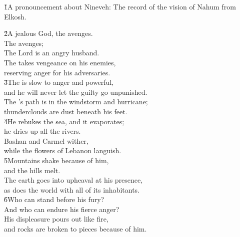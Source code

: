 


\v{1}A pronouncement about Nineveh: The record of the vision of Nahum from Elkosh.

\begin{poetry}
\poeml \v{2}A jealous God, the  avenges. \\
\poemll    The  avenges; \\
\poeml The Lord is an angry husband. \\
\poeml The  takes vengeance on his enemies, \\
\poemll    reserving anger for his adversaries. \\
\poeml \v{3}The  is slow to anger and powerful, \\
\poemll    and he will never let the guilty go unpunished. \\
\poeml The 's path is in the windstorm and hurricane; \\
\poemll    thunderclouds are dust beneath his feet. \\
\poeml \v{4}He rebukes the sea, and it evaporates; \\
\poemll    he dries up all the rivers. \\
\poeml Bashan and Carmel wither, \\
\poemll    while the flowers of Lebanon languish. \\
\poeml \v{5}Mountains shake because of him, \\
\poemll    and the hills melt. \\
\poeml The earth goes into upheaval at his presence, \\
\poemll    as does the world with all of its inhabitants. \\
\poeml \v{6}Who can stand before his fury? \\
\poemll    And who can endure his fierce anger? \\
\poeml His displeasure pours out like fire, \\
\poemll    and rocks are broken to pieces because of him.

\end{poetry}
